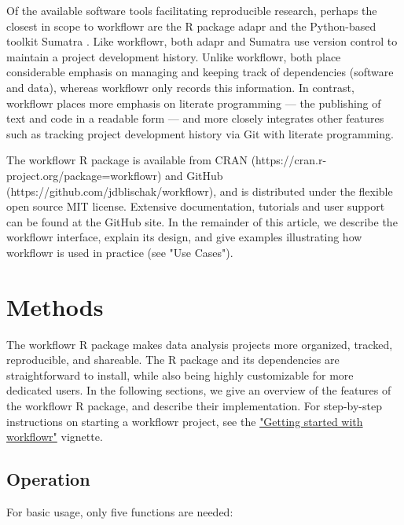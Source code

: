\documentclass[9pt,a4paper]{extarticle}
\begin{document}
Of the available software tools facilitating reproducible research,
perhaps the closest in scope to workflowr are the R package adapr
\cite{Gelfond2018} and the Python-based toolkit Sumatra
\cite{Davidson2014}. Like workflowr, both adapr and Sumatra use version
control to maintain a project development history. Unlike workflowr,
both place considerable emphasis on managing and keeping track of
dependencies (software and data), whereas workflowr only records this
information. In contrast, workflowr places more emphasis on literate
programming --- the publishing of text and code in a readable form ---
and more closely integrates other features such as tracking project
development history via Git with literate programming.

The workflowr R package is available from CRAN
(https://cran.r-project.org/package=workflowr) and GitHub
(https://github.com/jdblischak/workflowr), and is distributed under the
flexible open source MIT license. Extensive documentation, tutorials and
user support can be found at the GitHub site. In the remainder of this
article, we describe the workflowr interface, explain its design, and
give examples illustrating how workflowr is used in practice (see "Use
Cases").


\section*{Methods}

The workflowr R package makes data analysis projects more organized,
tracked, reproducible, and shareable. The R package and its dependencies
are straightforward to install, while also being highly customizable for
more dedicated users. In the following sections, we give an overview of
the features of the workflowr R package, and describe their
implementation. For step-by-step instructions on starting a workflowr
project, see the
\href{https://jdblischak.github.io/workflowr/articles/wflow-01-getting-started.html}{"Getting
started with workflowr"} vignette.

\subsection*{Operation}

For basic usage, only five functions are needed:
\end{document}
